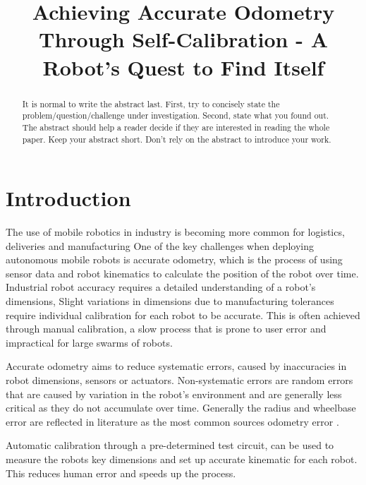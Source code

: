 \documentclass[conference]{IEEEtran}
\begin{document}
\title{Achieving Accurate Odometry Through Self-Calibration - A Robot's Quest to Find Itself}

\author{
    \and
}

\maketitle

\begin{abstract}
It is normal to write the abstract last.  First, try to concisely state the problem/question/challenge under investigation.  Second, state what you found out.  The abstract should help a reader decide if they are interested in reading the whole paper.  Keep your abstract short.  Don't rely on the abstract to introduce your work.
\end{abstract}


\section{Introduction}\label{sec:intro}

The use of mobile robotics in industry is becoming more common for logistics, deliveries and manufacturing
One of the key challenges when deploying autonomous mobile robots is accurate odometry, which is the process of using sensor data and robot kinematics to calculate the position of the robot over time.
Industrial robot accuracy requires a detailed understanding of a robot's dimensions,
Slight variations in dimensions due to manufacturing tolerances require individual calibration for each robot to be accurate.
This is often achieved through manual calibration, a slow process that is prone to user error and impractical for large swarms of robots. 

Accurate odometry aims to reduce systematic errors, caused by inaccuracies in robot dimensions, sensors or actuators. Non-systematic errors are random errors that are caused by variation in the robot's environment and are generally less critical as they do not accumulate over time.
Generally the radius and wheelbase error are reflected in literature as the most common sources odometry error \cite{UMBmark, width-radius}.

Automatic calibration through a pre-determined test circuit, can be used to measure the robots key dimensions and set up accurate kinematic for each robot. This reduces human error and speeds up the process.
\end{document}
